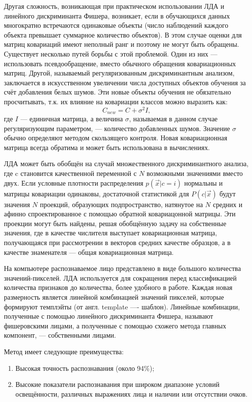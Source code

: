 Другая сложность, возникающая при практическом использовании ЛДА и линейного
дискриминанта Фишера, возникает, если в обучающихся данных многократно
встречаются одинаковые объекты (число наблюдений каждого объекта превышает
суммарное количество объектов). В этом случае оценки для матриц ковариаций имеют
неполный ранг и поэтому не могут быть обращены. Существует несколько путей
борьбы с этой проблемой. Один из них — использовать псевдообращение, вместо
обычного обращения ковариационных матриц. Другой, называемый регуляризованным
дискриминантным анализом, заключается в искусственном увеличении числа доступных
объектов обучения за счёт добавления белых шумов. Эти новые объекты обучения не
обязательно просчитывать, т.к. их влияние на ковариации классов можно выразить
как:
$$ C_{new}=C+\sigma^2I, $$
где $I$ --- единичная матрица, а величина $\sigma$, называемая в данном случае
регуляризующим параметром, --- количество добавленных шумов. Значение $\sigma$
обычно определяют методом скользящего контроля. Новая ковариационная матрица
всегда обратима и может быть использована в вычислениях.


ЛДА может быть обобщён на случай множественного дискриминантного анализа, где c
становится качественной переменной с $N$ возможными значениями вместо двух. Если
условные плотности распределения $p(\vec{x}|c=i)$ нормальны и матрицы ковариации
одинаковы, достаточной статистикой для $P(c|\vec{x})$ будут значения $N$
проекций, образующих подпространство, натянутое на $N$ средних и афинно
спроектированное с помощью обратной ковариацонной матрицы. Эти проекции могут
быть найдены, решая обобщённую задачу на собственные значения, где в качестве
числителя выступает ковариационная матрица, получающаяся при рассмотрении в
векторов средних качестве образцов, а в качестве знаменателя — общая
ковариационная матрица.


На компьютере распознаваемое лицо представлено в виде большого количества
значений-пикселей. ЛДА используется для сокращения перед классификацией
количества признаков до количества, более удобного в работе. Каждая новая
размерность является линейной комбинацией значений пикселей, которые формируют
темплэйты (от англ. template —- шаблон). Линейные комбинации, полученные с
помощью линейного дискриминанта Фишера, называют фишеровскими лицами, а
полученные с помощью схожего метода главных компонент, — собственными лицами.

Метод имеет следующие преимущества:
\begin{enumerate}
\item Высокая точность распознавания (около 94\%);
\item Высокие показатели распознавания при широком диапазоне условий 
освещённости, различных выражениях лица и наличии или отсутствии очков.
\end{enumerate}

